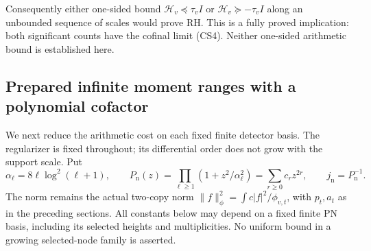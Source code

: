 \documentclass[11pt]{article}
\theoremstyle{remark}\newtheorem{remark}[theorem]{Remark}
\begin{document}
Consequently either one-sided bound
\(\mathcal H_v\preceq\tau_v I\) or
\(\mathcal H_v\succeq-\tau_v I\) along an unbounded sequence of
scales would prove RH. This is a fully proved implication:
both significant counts have the cofinal limit (CS4).
Neither one-sided arithmetic bound is established here.

\subsection{Prepared infinite moment ranges with a polynomial cofactor}
\label{sec:prepared-nearlinear}

We next reduce the arithmetic cost on each fixed finite detector
basis. The regularizer is fixed throughout; its differential order
does not grow with the support scale. Put
\[
 \alpha_\ell=8\ell\log^2(\ell+1),\qquad
 P_{\mathrm n}(z)=\prod_{\ell\ge1}(1+z^2/\alpha_\ell^2)
       =\sum_{r\ge0}c_rz^{2r},\qquad j_{\mathrm n}=P_{\mathrm n}^{-1}.
                                                               \tag{NL1}
\]
The norm remains the actual two-copy norm
\(\|f\|_\phi^2=\int c|f|^2/\phi_{v,t}\), with \(p_t,a_t\)
as in the preceding sections. All constants below may depend on
a fixed finite PN basis, including its selected heights and
multiplicities. No uniform bound in a growing selected-node family
is asserted.
\end{document}
